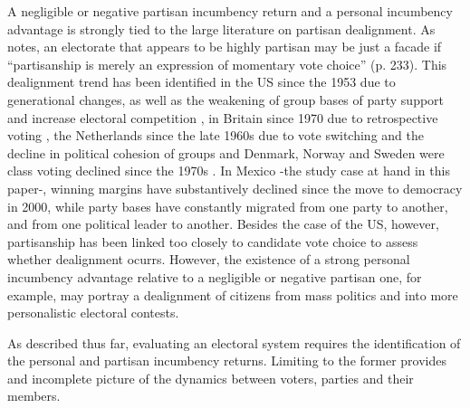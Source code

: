 \documentclass[12pt]{amsart}
\numberwithin{equation}{section}
\theoremstyle{definition}
\theoremstyle{definition}
\theoremstyle{definition}
\begin{document}
A negligible or negative partisan incumbency return and a personal incumbency advantage is strongly tied to the large literature on partisan dealignment. As \citet{beck_1985} notes, an electorate that appears to be highly partisan may be just a facade if ``partisanship is merely an expression of momentary vote choice'' (p. 233). This dealignment trend has been identified in the US since the 1953 due to generational changes, as well as the weakening of group bases of party support and increase electoral competition \citep{beck_1977, norpoth_rusk_1982}, in Britain since 1970 due to retrospective voting \citep{alt_1977}, the Netherlands since the late 1960s due to vote switching and the decline in political cohesion of groups \citep{irwin_dittrich} and Denmark, Norway and Sweden were class voting declined since the 1970s \citep{borre_1995}. In Mexico -the study case at hand in this paper-, winning margins have substantively declined since the move to democracy in 2000, while party bases have constantly migrated from one party to another, and from one political leader to another. Besides the case of the US, however, partisanship has been linked too closely to candidate vote choice to assess whether dealignment ocurrs.  However, the existence of a strong personal incumbency advantage relative to a negligible or negative partisan one, for example, may portray a dealignment of citizens from mass politics and into more personalistic electoral contests. 
   
As described thus far, evaluating an electoral system requires the identification of the personal and partisan incumbency returns. Limiting to the former provides and incomplete picture of the dynamics between voters, parties and their members. 
\end{document}
